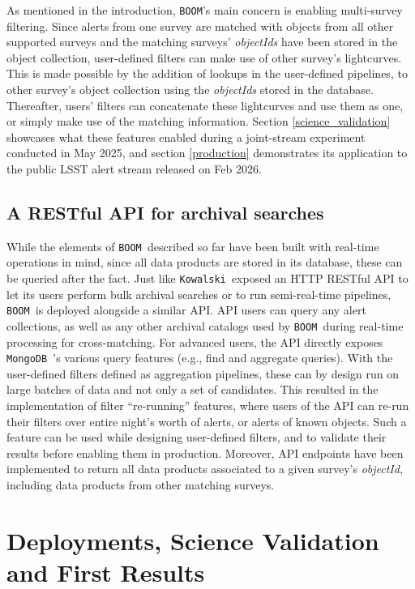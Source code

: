 \documentclass[twocolumn]{aastex631}
\newcommand{\boom}{\texttt{BOOM }}
\newcommand{\kowalski}{\texttt{Kowalski }}
\newcommand{\mongo}{\texttt{MongoDB }}
\begin{document}
As mentioned in the introduction, \texttt{BOOM}'s main concern is enabling multi-survey filtering. Since alerts from one survey are matched with objects from all other supported surveys and the matching surveys' \textit{objectIds} have been stored in the object collection, user-defined filters can make use of other survey's lightcurves. This is made possible by the addition of lookups in the user-defined pipelines, to other survey's object collection using the \textit{objectIds} stored in the database. Thereafter, users' filters can concatenate these lightcurves and use them as one, or simply make use of the matching information. Section \ref{science_validation} showcases what these features enabled during a joint-stream experiment conducted in May 2025, and section \ref{production} demonstrates its application to the public LSST alert stream released on Feb 2026.

\subsection{A RESTful API for archival searches}

While the elements of \boom described so far have been built with real-time operations in mind, since all data products are stored in its database, these can be queried after the fact.
Just like \kowalski exposed an HTTP RESTful API to let its users perform bulk archival searches or to run semi-real-time pipelines,
\boom is deployed alongside a similar API. API users can query any alert collections, as well as any other archival catalogs used by \boom during real-time processing for cross-matching. For advanced users, the API directly exposes \mongo's various query features (e.g., find and aggregate queries).
With the user-defined filters defined as aggregation pipelines, these can by design run on large batches of data and not only a set of candidates. This resulted in the implementation of filter ``re-running'' features, where users of the API can re-run their filters over entire night's worth of alerts, or alerts of known objects. Such a feature can be used while designing user-defined filters, and to validate their results before enabling them in production. Moreover, API endpoints have been implemented to return all data products associated to a given survey's \textit{objectId}, including data products from other matching surveys.

\section{Deployments, Science Validation and First Results}
\label{sec:science}
\end{document}
